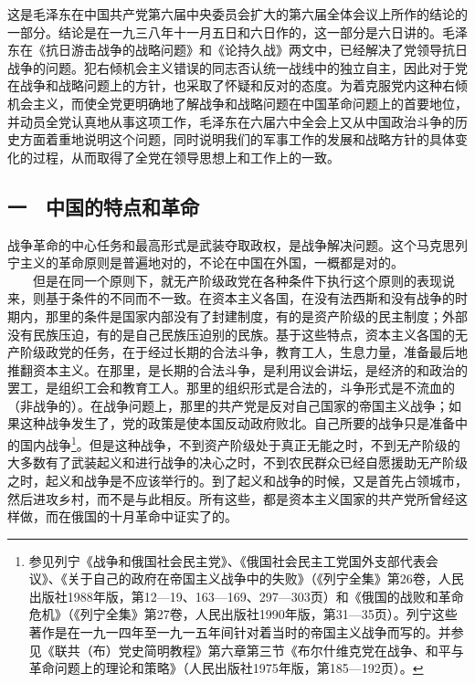 \documentclass[cn,11pt,chinese]{elegantbook}
\def\myformat#1{\hfil\hfil #1}
\begin{document}
\begin{introduction}\item  这是毛泽东在中国共产党第六届中央委员会扩大的第六届全体会议上所作的结论的一部分。结论是在一九三八年十一月五日和六日作的，这一部分是六日讲的。毛泽东在《抗日游击战争的战略问题》和《论持久战》两文中，已经解决了党领导抗日战争的问题。犯右倾机会主义错误的同志否认统一战线中的独立自主，因此对于党在战争和战略问题上的方针，也采取了怀疑和反对的态度。为着克服党内这种右倾机会主义，而使全党更明确地了解战争和战略问题在中国革命问题上的首要地位，并动员全党认真地从事这项工作，毛泽东在六届六中全会上又从中国政治斗争的历史方面着重地说明这个问题，同时说明我们的军事工作的发展和战略方针的具体变化的过程，从而取得了全党在领导思想上和工作上的一致。\end{introduction}
\subsection*{\myformat{一　中国的特点和革命}}
战争革命的中心任务和最高形式是武装夺取政权，是战争解决问题。这个马克思列宁主义的革命原则是普遍地对的，不论在中国在外国，一概都是对的。\\
　　但是在同一个原则下，就无产阶级政党在各种条件下执行这个原则的表现说来，则基于条件的不同而不一致。在资本主义各国，在没有法西斯和没有战争的时期内，那里的条件是国家内部没有了封建制度，有的是资产阶级的民主制度；外部没有民族压迫，有的是自己民族压迫别的民族。基于这些特点，资本主义各国的无产阶级政党的任务，在于经过长期的合法斗争，教育工人，生息力量，准备最后地推翻资本主义。在那里，是长期的合法斗争，是利用议会讲坛，是经济的和政治的罢工，是组织工会和教育工人。那里的组织形式是合法的，斗争形式是不流血的（非战争的）。在战争问题上，那里的共产党是反对自己国家的帝国主义战争；如果这种战争发生了，党的政策是使本国反动政府败北。自己所要的战争只是准备中的国内战争\footnote[1]{ 参见列宁《战争和俄国社会民主党》、《俄国社会民主工党国外支部代表会议》、《关于自己的政府在帝国主义战争中的失败》（《列宁全集》第26卷，人民出版社1988年版，第12—19、163—169、297—303页）和《俄国的战败和革命危机》（《列宁全集》第27卷，人民出版社1990年版，第31—35页）。列宁这些著作是在一九一四年至一九一五年间针对着当时的帝国主义战争而写的。并参见《联共（布）党史简明教程》第六章第三节《布尔什维克党在战争、和平与革命问题上的理论和策略》（人民出版社1975年版，第185—192页）。}。但是这种战争，不到资产阶级处于真正无能之时，不到无产阶级的大多数有了武装起义和进行战争的决心之时，不到农民群众已经自愿援助无产阶级之时，起义和战争是不应该举行的。到了起义和战争的时候，又是首先占领城市，然后进攻乡村，而不是与此相反。所有这些，都是资本主义国家的共产党所曾经这样做，而在俄国的十月革命中证实了的。\\
\end{document}
